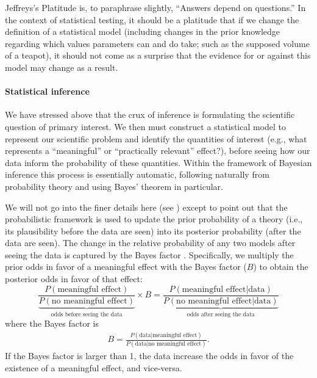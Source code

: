Jeffreys's Platitude \cite{Jeffreys1939} is, to paraphrase slightly, ``Answers depend on questions.'' In the context of statistical testing, it should be a platitude that if we change the definition of a statistical model (including changes in the prior knowledge regarding which values parameters can and do take; such as the supposed volume of a teapot), it should not come as a surprise that the evidence for or against this model may change as a result.

\paragraph{Statistical inference} 
We have stressed above that the crux of inference is formulating the scientific question of primary interest. We then must construct a statistical model to represent our scientific problem and identify the quantities of interest (e.g., what represents a ``meaningful'' or ``practically relevant'' effect?), before seeing how our data inform the probability of these quantities. Within the framework of Bayesian inference this process is essentially automatic, following naturally from probability theory and using Bayes' theorem in particular. 

We will not go into the finer details here (see ) except to point out that the probabilistic framework is used to update the prior probability of a theory (i.e., its plausibility before the data are seen) into its posterior probability (after the data are seen). The change in the relative probability of any two models after seeing the data is captured by the Bayes factor \cite{Jeffreys1961}. Specifically, we multiply the prior odds in favor of a meaningful effect with the Bayes factor ($B$) to obtain the posterior odds in favor of that effect:
$$
\underbrace{\frac{P(\text{meaningful effect})}{P(\text{no meaningful effect})}}_\text{odds before seeing the data} \times {B}
=
\underbrace{\frac{P(\text{meaningful effect}|\text{data})}{P(\text{no meaningful effect}|\text{data})}}_\text{odds after seeing the data}
$$ 
where the Bayes factor is
\begin{eqnarray}\label{eq:b}
B = \frac{P(\text{data}|\text{meaningful effect})}{P(\text{data}|\text{no meaningful effect})}.
\end{eqnarray}%
If the Bayes factor is larger than 1, the data increase the odds in favor of the existence of a meaningful effect, and vice-versa.

